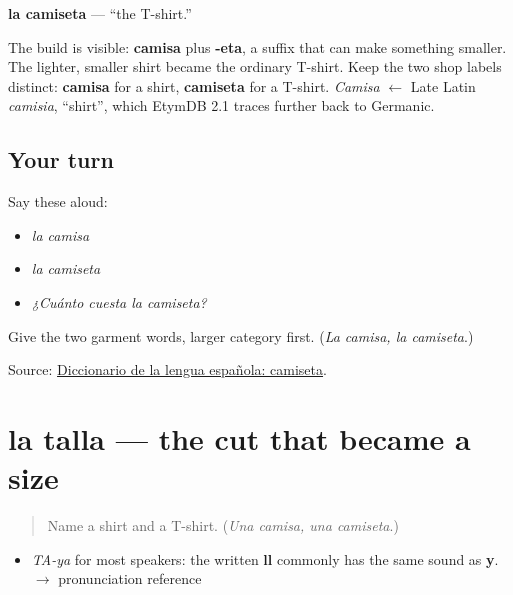 \begin{cousinweb}
\textbf{la camiseta} — \textquotedblleft{}the T-shirt.\textquotedblright{}

The build is visible: \textbf{camisa} plus \textbf{-eta}, a suffix that can make something smaller. The lighter, smaller shirt became the ordinary T-shirt. Keep the two shop labels distinct: \textbf{camisa} for a shirt, \textbf{camiseta} for a T-shirt. \emph{Camisa} $\leftarrow$ Late Latin \emph{camisia}, \textquotedblleft{}shirt\textquotedblright{}, which EtymDB 2.1 traces further back to Germanic.
\end{cousinweb}

\subsection*{Your turn}
Say these aloud:

\begin{itemize}
\raggedright
  \item \emph{la camisa}
  \item \emph{la camiseta}
  \item \emph{¿Cuánto cuesta la camiseta?}
\end{itemize}

\begin{tcolorbox}[breakable,colback=teal!4,colframe=teal!35!black,title={Before you move on}]
Give the two garment words, larger category first. (\emph{La camisa, la camiseta}.)

Source: \href{https://dle.rae.es/camiseta}{Diccionario de la lengua española: camiseta}.
\end{tcolorbox}
\section[la talla]{la talla — the cut that became a size}

\label{lesson:ES-C402-talla}



\begin{quote}
Name a shirt and a T-shirt. (\emph{Una camisa, una camiseta}.)
\end{quote}

\begin{sounds}
\begin{itemize}
\raggedright
  \item \emph{TA-ya} for most speakers: the written \textbf{ll} commonly has the same sound as \textbf{y}. $\to$ pronunciation reference
\end{itemize}
\end{sounds}

